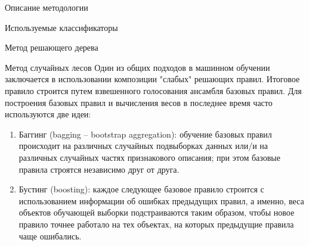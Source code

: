 \begin{section}{Описание методологии}
\begin{subsection}{Используемые классификаторы}
\begin{subsubsection}{Метод решающего дерева}
    \end{subsubsection}

    \begin{subsubsection}{Метод случайных лесов}
      Один из общих подходов в машинном обучении заключается в использовании композиции "слабых" решающих правил. Итоговое правило строится путем взвешенного голосования ансамбля базовых правил. Для построения базовых правил и вычисления весов в последнее время часто используются две идеи:
      \begin{enumerate}
        \item Баггинг (bagging – bootstrap aggregation): обучение базовых правил происходит на различных случайных подвыборках данных или/и на различных случайных частях признакового описания; при этом базовые правила строятся независимо друг от друга.
        \item Бустинг (boosting): каждое следующее базовое правило строится с использованием информации об ошибках предыдущих правил, а именно, веса объектов обучающей выборки подстраиваются таким образом, чтобы новое правило точнее работало на тех объектах, на которых предыдущие правила чаще ошибались.
      \end{enumerate}


\end{subsubsection}
\end{subsection}
\end{section}
